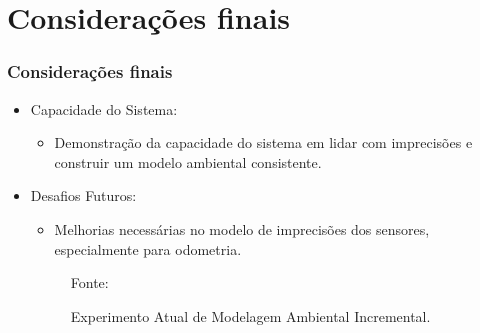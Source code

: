 \documentclass[xcolor=dvipsnames, aspectratio=169]{beamer}
\begin{document}
\section{Considerações finais}
  \begin{frame}
  \frametitle{Considerações finais}
  \begin{itemize}
      \item Capacidade do Sistema:
      \begin{itemize}
        \item Demonstração da capacidade do sistema em lidar com imprecisões e construir um modelo ambiental consistente.
      \end{itemize}
      \item Desafios Futuros:
      \begin{itemize}
        \item Melhorias necessárias no modelo de imprecisões dos sensores, especialmente para odometria.
      \end{itemize}
      \begin{figure}
        \centering
        {Fonte: \cite{moutarlier2006experimental}}
        \caption{Experimento Atual de Modelagem Ambiental Incremental.}
        \label{fig:8}
      \end{figure}


  \end{itemize}
\end{frame}
\end{document}
